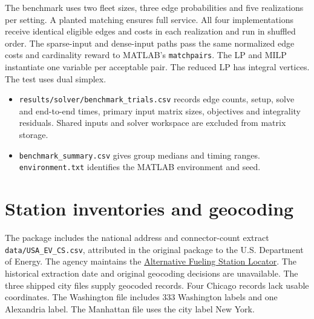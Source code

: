 \documentclass[11pt,a4paper]{article}
\begin{document}
The benchmark uses two fleet sizes, three edge probabilities and five realizations per setting. A planted matching ensures full service. All four implementations receive identical eligible edges and costs in each realization and run in shuffled order. The sparse-input and dense-input paths pass the same normalized edge costs and cardinality reward to MATLAB's \texttt{matchpairs}. The LP and MILP instantiate one variable per acceptable pair. The reduced LP has integral vertices. The test uses dual simplex.
\begin{itemize}
\item \texttt{results/solver/benchmark\_trials.csv} records edge counts, setup, solve and end-to-end times, primary input matrix sizes, objectives and integrality residuals. Shared inputs and solver workspace are excluded from matrix storage.
\item \texttt{benchmark\_summary.csv} gives group medians and timing ranges. \texttt{environment.txt} identifies the MATLAB environment and seed.
\end{itemize}

\newpage
\section*{Station inventories and geocoding}
The package includes the national address and connector-count extract \texttt{data/USA\_EV\_CS.csv}, attributed in the original package to the U.S. Department of Energy. The agency maintains the \href{https://afdc.energy.gov/stations}{Alternative Fueling Station Locator}. The historical extraction date and original geocoding decisions are unavailable. The three shipped city files supply geocoded records. Four Chicago records lack usable coordinates. The Washington file includes 333 Washington labels and one Alexandria label. The Manhattan file uses the city label New York.
\end{document}
